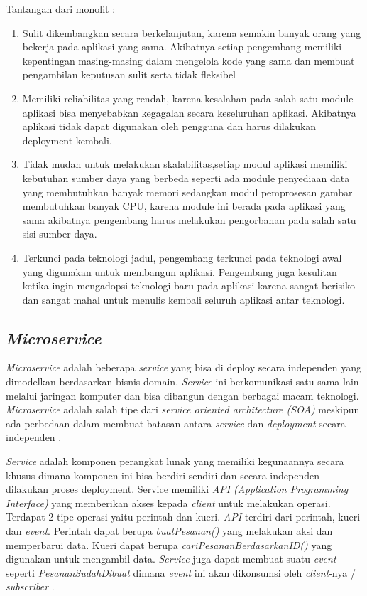 Tantangan dari monolit \cite{ECD,1C7}:
\begin{enumerate}[leftmargin=1.3cm]
	\item Sulit dikembangkan secara berkelanjutan, karena semakin banyak orang yang bekerja pada aplikasi yang sama. Akibatnya setiap pengembang memiliki kepentingan masing-masing dalam mengelola kode yang sama dan membuat pengambilan keputusan sulit serta tidak fleksibel
	\item Memiliki reliabilitas yang rendah, karena kesalahan pada salah satu module aplikasi bisa menyebabkan kegagalan secara keseluruhan aplikasi. Akibatnya aplikasi tidak dapat digunakan oleh pengguna dan harus dilakukan deployment kembali.
	\item Tidak mudah untuk melakukan skalabilitas,setiap modul aplikasi memiliki kebutuhan sumber daya yang berbeda seperti ada module penyediaan data yang membutuhkan banyak memori sedangkan modul pemprosesan gambar membutuhkan banyak CPU, karena module ini berada pada aplikasi yang sama akibatnya pengembang harus melakukan pengorbanan pada salah satu sisi sumber daya.
	\item Terkunci pada teknologi jadul, pengembang terkunci pada teknologi awal yang digunakan untuk membangun aplikasi. Pengembang juga kesulitan ketika ingin mengadopsi teknologi baru pada aplikasi karena sangat berisiko dan sangat mahal untuk menulis kembali seluruh aplikasi antar teknologi.\\
\end{enumerate}	

\subsection{\textit{Microservice}}
\textit{Microservice} adalah beberapa \textit{service} yang bisa di deploy secara independen yang dimodelkan berdasarkan bisnis domain. \textit{Service} ini berkomunikasi satu sama lain melalui jaringan komputer dan bisa dibangun dengan berbagai macam teknologi. \textit{Microservice} adalah salah tipe dari \textit{service oriented architecture (SOA)} meskipun ada perbedaan dalam membuat batasan antara \textit{service} dan \textit{deployment} secara independen \cite{1C7}.

\textit{Service} adalah komponen perangkat lunak yang memiliki kegunaannya secara khusus dimana komponen ini bisa berdiri sendiri dan secara independen dilakukan proses deployment. Service memiliki \textit{API (Application Programming Interface)} yang memberikan akses kepada \textit{client} untuk melakukan operasi. Terdapat 2 tipe operasi yaitu perintah dan kueri.
\textit{API} terdiri dari perintah, kueri dan \textit{event}. Perintah dapat berupa \textit{buatPesanan()} yang melakukan aksi dan memperbarui data. Kueri dapat berupa \textit{cariPesananBerdasarkanID()} yang digunakan untuk mengambil data. \textit{Service} juga dapat membuat suatu \textit{event} seperti \textit{PesananSudahDibuat} dimana \textit{event} ini akan dikonsumsi oleh \textit{client}-nya / \textit{subscriber} \cite{1C7}.

